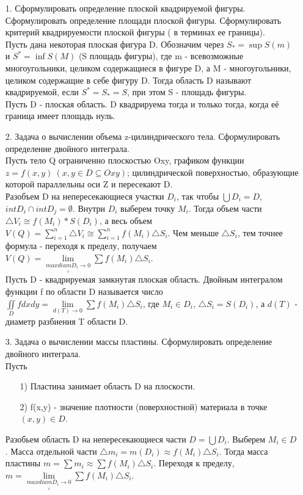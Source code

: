 \documentclass[a4paper]{article}
\begin{document}
\begin{enumerate}
\item[1.] Сформулировать  определение плоской квадрируемой фигуры. Сформулировать определение площади плоской фигуры. Сформулировать критерий квадрируемости плоской фигуры ( в терминах ее границы). \\

Пусть дана некоторая плоская фигура D. Обозначим через $S_* = \sup{S(m)}$ и $S^* = \inf{S(M)}$ (S площадь фигуры), где m - всевозможные многоугольники, целиком содержащиеся в фигуре D, а M - многоугольники, целиком содержащие в себе фигуру D. Тогда область D называют квадрируемой, если $S^* = S_* = S$, при этом S - площадь фигуры. \\
Пусть D - плоская область. D квадрируема тогда и только тогда, когда её граница имеет площадь нуль. \\


\item[2.] Задача о вычислении объема z-цилиндрического тела. Сформулировать определение двойного интеграла. \\

Пусть тело Q ограниченно плоскостью Oxy, графиком функции $z = f(x,y) \ (x,y \in D \subseteq Oxy)$; цилиндрической поверхностью, образующие которой параллельны оси Z и пересекают D. \\
Разобъем D на непересекающиеся участки $D_i$, так чтобы $\bigcup D_i = D$, $int D_i \cap int D_j = \emptyset$. Внутри $D_i$ выберем точку $M_i$. Тогда объем части $\triangle V_i \cong f(M_i) * S(D_i)$, а весь объем $V(Q) = \sum\limits_{i = 1}^{n} \triangle V_i \cong \sum\limits_{i = 1}^{n} f(M_i) \triangle S_i$. Чем меньше $\triangle S_i$, тем точнее формула - переходя к пределу, получаем $V(Q) = \lim\limits_{\underset{i}{max diam D_i \to 0}} \sum f(M_i) \triangle S_i$. \\

Пусть D - квадрируемая замкнутая плоская область. Двойным интегралом функции f по области D называется число $\displaystyle  \iint\limits_{D} f dxdy = \lim\limits_{d(T) \to 0} \sum f(M_i) \triangle S_i$, где $M_i \in D_i$, $\triangle S_i = S(D_i)$, а $d(T)$ - диаметр разбиения T области D. \\


\item[3.] Задача о вычислении массы пластины. Сформулировать определение двойного интеграла. \\

Пусть
\begin{enumerate}
\item[1)] Пластина занимает область D на плоскости.
\item[2)] f(x,y) - значение плотности (поверхностной) материала в точке $(x,y) \in D$.
\end{enumerate}
Разобьем область D на непересекающиеся части $D = \bigcup D_i$. Выберем $M_i \in D$. Масса отдельной части $\triangle m_i = m(D_i) \approx f(M_i) \triangle S_i$. Тогда масса пластины $m = \sum m_i \approx \sum f(M_i) \triangle S_i$. Переходя к пределу, $m = \lim\limits_{\underset{i}{max diam D_i \to 0}} \sum f(M_i) \triangle S_i$. \\


\end{enumerate}
\end{document}
